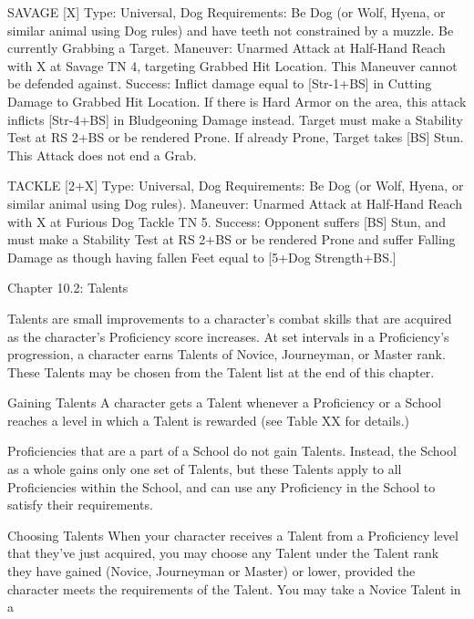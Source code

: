 \documentclass[oneside,11pt,english]{book}
\begin{document}
 


SAVAGE [X] 
Type: Universal, Dog 
Requirements: Be Dog (or Wolf, Hyena, or similar animal using Dog rules) and have teeth not 
constrained by a muzzle. Be currently Grabbing a Target. 
Maneuver: Unarmed Attack at Half-Hand Reach with X at Savage TN 4, targeting Grabbed Hit 
Location. This Maneuver cannot be defended against. 
Success: Inflict damage equal to [Str-1+BS] in Cutting Damage to Grabbed Hit Location. If there is Hard 
Armor on the area, this attack inflicts [Str-4+BS] in Bludgeoning Damage instead. Target must make a 
Stability Test at RS 2+BS or be rendered Prone. If already Prone, Target takes [BS] Stun. 
This Attack does not end a Grab. 

 

TACKLE [2+X] 
Type: Universal, Dog 
Requirements: Be Dog (or Wolf, Hyena, or similar animal using Dog rules). 
Maneuver: Unarmed Attack at Half-Hand Reach with X at Furious Dog Tackle TN 5. 
Success: Opponent suffers [BS] Stun, and must make a Stability Test at RS 2+BS or be rendered Prone 
and suffer Falling Damage as though having fallen Feet equal to [5+Dog Strength+BS.] 

 

 

Chapter 10.2: Talents 

 

 

Talents are small improvements to a character’s combat skills that are acquired as the character’s 
Proficiency score increases. At set intervals in a Proficiency’s progression, a character earns Talents of 
Novice, Journeyman, or Master rank. These Talents may be chosen from the Talent list at the end of this 
chapter. 

 

Gaining Talents 
A character gets a Talent whenever a Proficiency or a School reaches a level in which a Talent is 
rewarded (see Table XX for details.) 

 

Proficiencies that are a part of a School do not gain Talents. Instead, the School as a whole gains only one 
set of Talents, but these Talents apply to all Proficiencies within the School, and can use any Proficiency 
in the School to satisfy their requirements. 

 

Choosing Talents 
When your character receives a Talent from a Proficiency level that they’ve just acquired, you may 
choose any Talent under the Talent rank they have gained (Novice, Journeyman or Master) or lower, 
provided the character meets the requirements of the Talent. You may take a Novice Talent in a 
\end{document}
